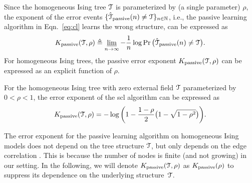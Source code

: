 Since the homogeneous Ising tree $\mathcal{T}$ is parameterized by (a single parameter) $\rho$, the exponent of the error events $\{\hat{\mathcal{T}}_{{\rm passive}}(n)\neq \mathcal{T}\}_{n\in \mathbb{N}}$, i.e., the passive learning algorithm in Eqn.~\eqref{eq:cl} learns the wrong structure, can be expressed as
\begin{align}\label{eq:passiveee}
	K _{{\rm passive}}(\mathcal{T},\rho)\triangleq \varliminf_{n\rightarrow \infty}-\frac{1}{n}\log \Pr \big(\hat{\mathcal{T}}_{{\rm passive}}(n)\neq \mathcal{T}\big).
\end{align}
For homogeneous Ising trees, the passive error exponent $K _{{\rm passive}}(\mathcal{T},\rho)$ can be expressed as an  explicit  function of $\rho$.
\begin{proposition}
	For the homogeneous Ising tree with zero external field $\mathcal{T}$ parameterized by $0<\rho<1$, the error exponent of the \ac{scl} algorithm can be expressed as
	\begin{align}
		K _{{\rm passive}}(\mathcal{T},\rho)=-\log\bigg(1-\frac{1-\rho}{2}\big(1-\sqrt{1-\rho^{2}}\big)\bigg).
	\end{align} 
\end{proposition}
\begin{remark}
	The error exponent for the passive learning algorithm on homogeneous Ising models does not depend on the tree structure $\mathcal{T}$, but only depends on the edge 
	correlation \cite{tandon2020exact}. This is because the number of nodes is finite (and not growing) in our setting. In the following, we will denote $K _{{\rm passive}}(\mathcal{T},\rho)$ as $K _{{\rm passive}}(\rho)$ to suppress its dependence on the underlying structure~$\mathcal{T}$.
\end{remark}

